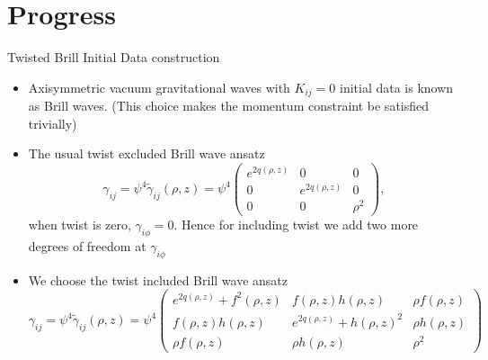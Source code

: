 \documentclass[9pt]{beamer}
\begin{document}
\section{Progress}
\begin{frame}{Twisted Brill Initial Data construction}
\begin{itemize}

    \item Axisymmetric vacuum gravitational waves with $K_{ij}=0$ initial data is known as Brill waves. (This choice makes the momentum constraint be satisfied trivially)

    \item The usual twist excluded Brill wave ansatz 
\[
\gamma_{ij} = \psi^4 \tilde{\gamma}_{ij}(\rho,z)  = 
\psi ^4\begin{pmatrix}
    e^{2q(\rho,z)} & 0 & 0 \\
    0 & e^{2q(\rho,z)} & 0 \\
    0 & 0 & \rho^{2}
\end{pmatrix},
\]
when twist is zero, $\gamma_{i\phi} = 0$. Hence for including twist we add two more degrees of freedom at $\gamma_{i \phi}$

 \item We choose the twist included Brill wave ansatz 
    \[
\gamma_{ij} = \psi^4 \tilde{\gamma}_{ij}(\rho,z) =
\psi ^4\begin{pmatrix}
    e^{2q(\rho,z)} + f^2(\rho,z) & f(\rho,z)h(\rho,z) & \rho f(\rho,z) \\
    f(\rho,z)h(\rho,z) & e^{2q(\rho,z)} + h(\rho,z)^2 & \rho h(\rho,z) \\
    \rho f(\rho,z) & \rho h(\rho,z) & \rho^{2}
\end{pmatrix}
\]

\end{itemize}
\end{frame}
\end{document}
